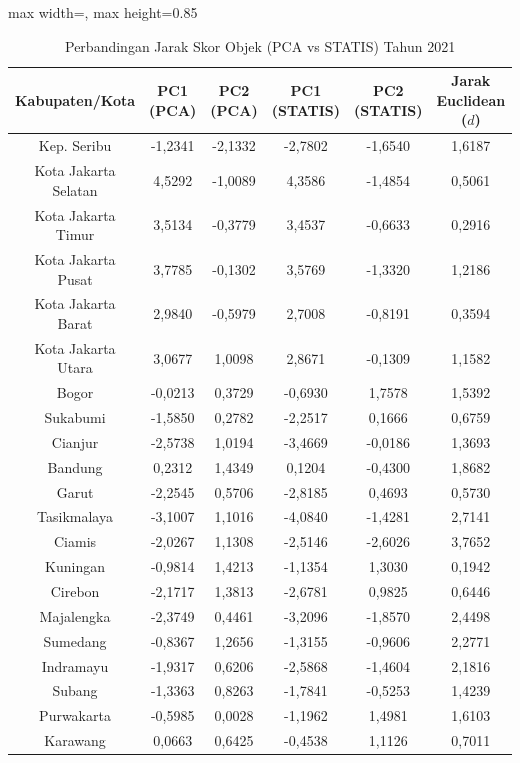 \begin{table}[H]
\centering
\caption{Perbandingan Jarak Skor Objek (PCA vs STATIS) Tahun 2021} \label{tab:app2jarak_skor_2021}
\begin{adjustbox}{max width=\textwidth, max height=0.85\textheight}
\begin{tabular}{|c|c|c|c|c|c|}
\hline
\textbf{Kabupaten/Kota} & \textbf{PC1 (PCA)} & \textbf{PC2 (PCA)} & \textbf{PC1 (STATIS)} & \textbf{PC2 (STATIS)} & \textbf{Jarak Euclidean ($d$)} \\
\hline
Kep. Seribu & -1,2341 & -2,1332 & -2,7802 & -1,6540 & 1,6187 \\
Kota Jakarta Selatan & 4,5292 & -1,0089 & 4,3586 & -1,4854 & 0,5061 \\
Kota Jakarta Timur & 3,5134 & -0,3779 & 3,4537 & -0,6633 & 0,2916 \\
Kota Jakarta Pusat & 3,7785 & -0,1302 & 3,5769 & -1,3320 & 1,2186 \\
Kota Jakarta Barat & 2,9840 & -0,5979 & 2,7008 & -0,8191 & 0,3594 \\
Kota Jakarta Utara & 3,0677 & 1,0098 & 2,8671 & -0,1309 & 1,1582 \\
Bogor & -0,0213 & 0,3729 & -0,6930 & 1,7578 & 1,5392 \\
Sukabumi & -1,5850 & 0,2782 & -2,2517 & 0,1666 & 0,6759 \\
Cianjur & -2,5738 & 1,0194 & -3,4669 & -0,0186 & 1,3693 \\
Bandung & 0,2312 & 1,4349 & 0,1204 & -0,4300 & 1,8682 \\
Garut & -2,2545 & 0,5706 & -2,8185 & 0,4693 & 0,5730 \\
Tasikmalaya & -3,1007 & 1,1016 & -4,0840 & -1,4281 & 2,7141 \\
Ciamis & -2,0267 & 1,1308 & -2,5146 & -2,6026 & 3,7652 \\
Kuningan & -0,9814 & 1,4213 & -1,1354 & 1,3030 & 0,1942 \\
Cirebon & -2,1717 & 1,3813 & -2,6781 & 0,9825 & 0,6446 \\
Majalengka & -2,3749 & 0,4461 & -3,2096 & -1,8570 & 2,4498 \\
Sumedang & -0,8367 & 1,2656 & -1,3155 & -0,9606 & 2,2771 \\
Indramayu & -1,9317 & 0,6206 & -2,5868 & -1,4604 & 2,1816 \\
Subang & -1,3363 & 0,8263 & -1,7841 & -0,5253 & 1,4239 \\
Purwakarta & -0,5985 & 0,0028 & -1,1962 & 1,4981 & 1,6103 \\
Karawang & 0,0663 & 0,6425 & -0,4538 & 1,1126 & 0,7011 \\

\end{tabular}
\end{adjustbox}
\end{table}
